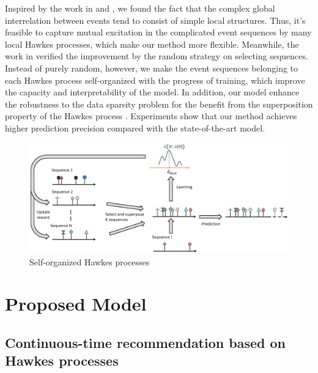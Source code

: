 \documentclass[runningheads]{llncs}
\begin{document}
Inspired by the work in \cite{lee2013local} and \cite{lee2014local}, we found the fact that the complex global interrelation between events tend to consist of simple local structures. 
Thus, it's feasible to capture mutual excitation in the complicated event sequences by many local Hawkes processes, which make our method more flexible. 
Meanwhile, the work in \cite{xu2018benefits} verified the improvement by the random strategy on selecting sequences. 
Instead of purely random, however, we make the event sequences belonging to each Hawkes process self-organized with the progress of training, which improve the capacity and interpretability of the model.
In addition, our model enhance the robustness to the data sparsity problem for the benefit from the superposition property of the Hawkes process \cite{xu2018benefits}.
Experiments show that our method achieves higher prediction precision compared with the state-of-the-art model.


\begin{figure}[htbp]
\centerline{\includegraphics[scale=0.4]{figure1.eps}}
\caption{Self-organized Hawkes processes}
\label{fig1}
\end{figure}

\section{Proposed Model}
\subsection{Continuous-time recommendation based on Hawkes processes}
\end{document}
